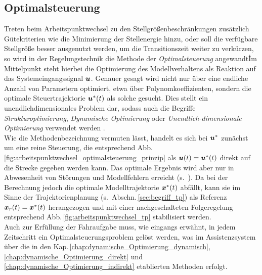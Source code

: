 \subsection{Optimalsteuerung} \label{sec:def_optimalsteuerung}
Treten beim Arbeitspunktwechsel zu den Stellgrößenbeschränkungen zusätzlich Gütekriterien wie die Minimierung der Stellenergie hinzu, oder soll die verfügbare Stellgröße besser ausgenutzt werden, um die Transitionszeit weiter zu verkürzen, so wird in der Regelungstechnik die Methode der \emph{Optimalsteuerung} \cite{foellingeroptimal} angewandt\. %
Im Mittelpunkt steht hierbei die Optimierung des Modellverhaltens als Reaktion auf das Systemeingangssignal $\boldsymbol{u}$. Genauer gesagt wird nicht nur über eine endliche Anzahl von Parametern optimiert, etwa über Polynomkoeffizienten, sondern die optimale Steuertrajektorie $\boldsymbol{u}^\ast(t)$ als solche gesucht. Dies stellt ein unendlichdimensionales Problem dar, sodass auch die Begriffe \emph{Strukturoptimierung}, \emph{Dynamische Optimierung} oder \emph{Unendlich-dimensionale Optimierung} verwendet werden \cite{foellingeroptimal}. \\
Wie die Methodenbezeichnung vermuten lässt, handelt es sich bei $\boldsymbol{u}^\ast$ zunächst um eine reine Steuerung, die entsprechend Abb.\,\ref{fig:arbeitspunktwechsel_optimalsteuerung_prinzip} als $\boldsymbol{u}(t) = \boldsymbol{u}^\ast(t)$ direkt auf die Strecke gegeben werden kann. Das optimale Ergebnis wird aber nur in Abwesenheit von Störungen und Modellfehlern erreicht (s.\ ). Da bei der Berechnung jedoch die optimale Modelltrajektorie $\boldsymbol{x}^\ast(t)$ abfällt, kann sie im Sinne der Trajektorienplanung (s.\ Abschn.\,\ref{sec:begriff_tp}) als Referenz $\boldsymbol{x}_r(t) = \boldsymbol{x}^\ast(t)$ herangezogen und mit einer nachgeschalteten Folgeregelung entsprechend Abb.\,\ref{fig:arbeitspunktwechsel_tp} stabilisiert werden. \\
Auch zur Erfüllung der Fahraufgabe muss, wie eingangs erwähnt, in jedem Zeitschritt ein Optimalsteuerungsproblem gelöst werden, was im Assistenzsystem über die in den Kap.\,\ref{chap:dynamische_Optimierung_dynamisch}, \ref{chap:dynamische_Optimierung_direkt} und \ref{chap:dynamische_Optimierung_indirekt} etablierten Methoden erfolgt.
